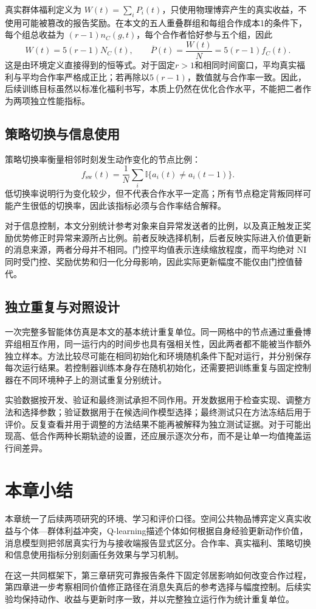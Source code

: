 真实群体福利定义为 $W(t)=\sum_iP_i(t)$，只使用物理博弈产生的真实收益，不使用可能被篡改的报告奖励。在本文的五人重叠群组和每组合作成本1的条件下，每个组总收益为 $(r-1)n_C(g,t)$，每个合作者恰好参与五个组，因此
\begin{equation}
 W(t)=5(r-1)N_C(t),\qquad \overline P(t)=\frac{W(t)}{N}=5(r-1)f_C(t).
 \label{eq:foundation-welfare-identity}
\end{equation}
这是由环境定义直接得到的恒等式。对于固定$r>1$和相同时间窗口，平均真实福利与平均合作率严格成正比；若再除以$5(r-1)$，数值就与合作率一致。因此，后续训练目标虽然以标准化福利书写，本质上仍然在优化合作水平，不能把二者作为两项独立性能指标。

\subsection{策略切换与信息使用}

策略切换率衡量相邻时刻发生动作变化的节点比例：
\begin{equation}
 f_{\mathrm{sw}}(t)=\frac{1}{N}\sum_i\mathbb I\{a_i(t)\neq a_i(t-1)\}.
 \label{eq:foundation-switch}
\end{equation}
低切换率说明行为变化较少，但不代表合作水平一定高；所有节点稳定背叛同样可能产生很低的切换率，因此该指标必须与合作率结合解释。

对于信息控制，本文分别统计参考对象来自异常发送者的比例，以及真正触发正奖励优势修正时异常来源所占比例。前者反映选择机制，后者反映实际进入价值更新的消息来源，两者分母并不相同。门控平均值表示连续缩放程度，而平均绝对 NI 同时受门控、奖励优势和归一化分母影响，因此实际更新幅度不能仅由门控值替代。

\subsection{独立重复与对照设计}

一次完整多智能体仿真是本文的基本统计重复单位。同一网格中的节点通过重叠博弈组相互作用，同一运行内的时间步也具有强相关性，因此两者都不能被当作额外独立样本。方法比较尽可能在相同初始化和环境随机条件下配对运行，并分别保存每次运行结果。若控制器训练本身存在随机初始化，还需要把训练重复与固定控制器在不同环境种子上的测试重复分别统计。

实验数据按开发、验证和最终测试承担不同作用。开发数据用于检查实现、调整方法和选择参数；验证数据用于在候选间作模型选择；最终测试只在方法冻结后用于评价。反复查看并用于调整的方法结果不能再被解释为独立测试证据。对于可能出现高、低合作两种长期轨迹的设置，还应展示逐次分布，而不是让单一均值掩盖运行间差异。

\section{本章小结}

本章统一了后续两项研究的环境、学习和评价口径。空间公共物品博弈定义真实收益与个体—群体利益冲突，Q-learning描述个体如何根据自身经验更新动作价值，消息模型则把邻居真实行为与接收端报告显式区分。合作率、真实福利、策略切换和信息使用指标分别刻画任务效果与学习机制。

在这一共同框架下，第三章研究可靠报告条件下固定邻居影响如何改变合作过程，第四章进一步考察相同价值修正路径在消息失真后的参考选择与幅度控制。后续实验均保持动作、收益与更新时序一致，并以完整独立运行作为统计重复单位。